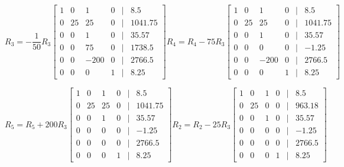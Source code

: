 \documentclass[11pt]{article}
\begin{document}
\begin{enumerate}
\begin{enumerate}
\[
    R_3 = -\frac{1}{50}R_3
    \begin{bmatrix}
        1 & 0 & 1 & 0 &|& 8.5 \\
        0 & 25 & 25 & 0 &|& 1041.75 \\
        0 & 0 & 1 & 0 &|& 35.57 \\
        0 & 0 & 75 & 0 &|& 1738.5 \\
        0 & 0 & -200 & 0 &|& 2766.5 \\
        0 & 0 & 0 & 1 &|& 8.25
    \end{bmatrix}
    R_4 = R_4 - 75R_3
    \begin{bmatrix}
        1 & 0 & 1 & 0 &|& 8.5 \\
        0 & 25 & 25 & 0 &|& 1041.75 \\
        0 & 0 & 1 & 0 &|& 35.57 \\
        0 & 0 & 0 & 0 &|& -1.25 \\
        0 & 0 & -200 & 0 &|& 2766.5 \\
        0 & 0 & 0 & 1 &|& 8.25
    \end{bmatrix}
\]

\[
    R_5 = R_5 + 200R_3
    \begin{bmatrix}
        1 & 0 & 1 & 0 &|& 8.5 \\
        0 & 25 & 25 & 0 &|& 1041.75 \\
        0 & 0 & 1 & 0 &|& 35.57 \\
        0 & 0 & 0 & 0 &|& -1.25 \\
        0 & 0 & 0 & 0 &|& 2766.5 \\
        0 & 0 & 0 & 1 &|& 8.25
    \end{bmatrix}
    R_2 = R_2 - 25R_3
    \begin{bmatrix}
        1 & 0 & 1 & 0 &|& 8.5 \\
        0 & 25 & 0 & 0 &|& 963.18 \\
        0 & 0 & 1 & 0 &|& 35.57 \\
        0 & 0 & 0 & 0 &|& -1.25 \\
        0 & 0 & 0 & 0 &|& 2766.5 \\
        0 & 0 & 0 & 1 &|& 8.25
    \end{bmatrix}
\]


\end{enumerate}
\end{enumerate}
\end{document}
